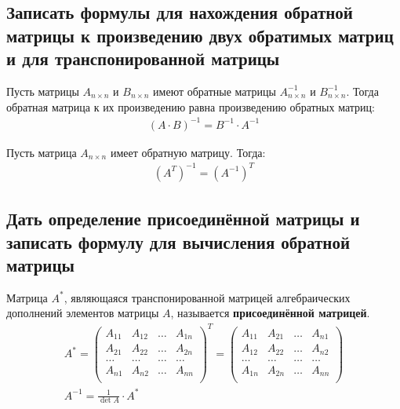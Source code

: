 \subsection{Записать формулы для нахождения обратной матрицы к произведению двух обратимых матриц и для транспонированной матрицы}
\begin{theorem*}
	Пусть матрицы $A_{n\times n}$ и $B_{n\times n}$ имеют обратные матрицы $A^{-1}_{n\times n}$ и $B^{-1}_{n\times n}$. Тогда обратная матрица к их произведению равна произведению обратных матриц:
	\begin{gather*}
		(A\cdot B)^{-1} = B^{-1} \cdot A^{-1}
	\end{gather*}
\end{theorem*}
\begin{theorem*}
	Пусть матрица $A_{n\times n}$ имеет обратную матрицу. Тогда:
	\begin{gather*}
		\left(A^T\right)^{-1} = \left(A^{-1}\right)^T
	\end{gather*}
\end{theorem*}

\newpage
\subsection{Дать определение присоединённой матрицы и записать формулу для вычисления обратной матрицы}
\begin{definition*}
	Матрица $A^*$, являющаяся транспонированной матрицей алгебраических дополнений элементов матрицы $A$, называется \textbf{присоединённой матрицей}.
	\begin{gather*}
		A^{*} = \begin{pmatrix}
			A_{11} & A_{12} & \ldots & A_{1n} \\
			A_{21} & A_{22} & \ldots & A_{2n} \\
			\ldots & \ldots & \ldots & \ldots \\
			A_{n1} & A_{n2} & \ldots & A_{nn} \\
		\end{pmatrix}^{T} = \begin{pmatrix}
			A_{11} & A_{21} & \ldots & A_{n1} \\
			A_{12} & A_{22} & \ldots & A_{n2} \\
			\ldots & \ldots & \ldots & \ldots \\
			A_{1n} & A_{2n} & \ldots & A_{nn} \\
		\end{pmatrix}\\
		A^{-1} = \frac{1}{\det A} \cdot A^*
	\end{gather*}
\end{definition*}

